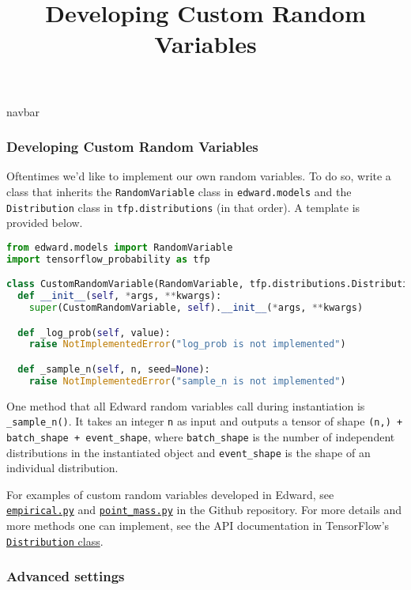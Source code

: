 \title{Developing Custom Random Variables}

{{navbar}}

\subsubsection{Developing Custom Random Variables}

Oftentimes we'd like to implement our own random variables.
To do so, write a class that inherits
the \texttt{RandomVariable} class in \texttt{edward.models} and
the \texttt{Distribution} class in \texttt{tfp.distributions} (in that
order). A template is provided below.

\begin{lstlisting}[language=Python]
from edward.models import RandomVariable
import tensorflow_probability as tfp

class CustomRandomVariable(RandomVariable, tfp.distributions.Distribution):
  def __init__(self, *args, **kwargs):
    super(CustomRandomVariable, self).__init__(*args, **kwargs)

  def _log_prob(self, value):
    raise NotImplementedError("log_prob is not implemented")

  def _sample_n(self, n, seed=None):
    raise NotImplementedError("sample_n is not implemented")
\end{lstlisting}

One method that all Edward random variables call during instantiation is
\texttt{\_sample\_n()}.
It takes an integer \texttt{n} as input and outputs a tensor of shape
\texttt{(n,) + batch\_shape + event\_shape}, where \texttt{batch\_shape}
is the number of independent distributions in the instantiated object
and \texttt{event\_shape} is the shape of an individual distribution.

For examples of custom random variables developed in Edward, see
\href{https://github.com/blei-lab/edward/blob/master/edward/models/empirical.py}{\texttt{empirical.py}}
and
\href{https://github.com/blei-lab/edward/blob/master/edward/models/point_mass.py}{\texttt{point\_mass.py}}
in the Github repository.
For more details and more methods one can implement, see the API
documentation in TensorFlow's
\href{https://www.tensorflow.org/probability/api_docs/python/tfp/distributions}{\texttt{Distribution} class}.

\subsubsection{Advanced settings}


